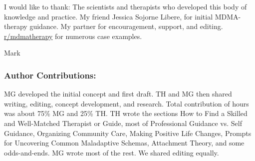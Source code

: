\documentclass[12pt,letterpaper]{book}
\begin{document}
I would like to thank: The scientists and therapists who developed this body of knowledge and practice. My friend Jessica Sojorne Libere, for initial MDMA-therapy guidance. My partner for encouragement, support, and editing. \href{https://www.reddit.com/r/mdmatherapy}{r/mdmatherapy} for numerous case examples.

Mark


\subsubsection{Author Contributions:} MG developed the initial concept and first draft. TH and MG then shared writing, editing, concept development, and research. Total contribution of hours was about 75\% MG and 25\% TH. TH wrote the sections How to Find a Skilled and Well-Matched Therapist or Guide, most of Professional Guidance vs. Self Guidance, Organizing Community Care, Making Positive Life Changes, Prompts for Uncovering Common Maladaptive Schemas, Attachment Theory, and some odds-and-ends. MG wrote most of the rest. We shared editing equally.
\end{document}
